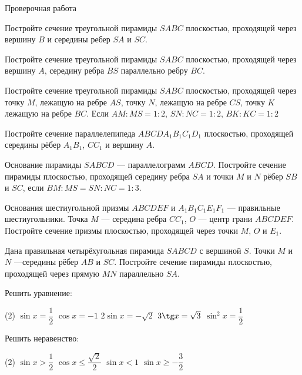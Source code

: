 \begin{exam}
	\begin{listofex}
		\item Проверочная работа
	\end{listofex}
\end{exam}

\begin{consultation}
	\begin{listofex}
		\item Постройте сечение треугольной пирамиды \(SABC\) плоскостью, проходящей через вершину \(B\) и середины ребер \(SA\) и \(SC\).
		\item Постройте сечение треугольной пирамиды \(SABC\) плоскостью, проходящей через вершину \(A\), середину ребра \(BS\) параллельно ребру \(BC\).
		\item  Постройте сечение треугольной пирамиды \(SABC\) плоскостью, проходящей через точку \(M\), лежащую на ребре \(AS\), точку \(N\), лежащую на ребре \(CS\), точку \(K\) лежащую на ребре \(BC\). Если \(AM:MS=1:2\), \(SN:NC=1:2\), \(BK:KC=1:2\)
		\item  Постройте сечение параллелепипеда \(ABCDA_1B_1C_1D_1\) плоскостью, проходящей середины рёбер \(A_1B_1\), \(CC_1\) и вершину \(A\).
		\item Основание пирамиды \(SABCD\) — параллелограмм \(ABCD\). Постройте сечение пирамиды плоскостью, проходящей середину ребра \(SA\) и точки \(M\) и \(N\) рёбер \(SB\) и \(SC\), если \(BM:MS=SN:NC =1:3\).
		\item  Основания шестиугольной призмы \(ABCDEF\) и \(A_1B_1C_1E_1F_1\) --- правильные шестиугольники. Точка \(M\) --- середина ребра \(CC_1\), \(O\) --- центр грани \(ABCDEF\). Постройте сечение призмы плоскостью, проходящей через точки \(M\), \(O\) и \(E_1\).
		\item  Дана правильная четырёхугольная пирамида \(SABCD\) с вершиной \(S\). Точки \(M\) и \(N\) —середины рёбер \(AB\) и \(SC\). Постройте сечение пирамиды плоскостью, проходящей через прямую \(MN\) параллельно \(SA\).
		\newpage
		
		\item Решить уравнение:
		\begin{tasks}(2)
			\task \( \sin x = \dfrac{1}{2} \)
			\task \( \cos x = -1 \)
			\task \( 2\sin x = -\sqrt{2} \)
			\task \( 3\tg x = \sqrt{3} \)
			\task \( \sin^2 x = \dfrac{1}{2} \)
		\end{tasks}
		\item Решить неравенство:
		\begin{tasks}(2)
			\task \( \sin x > \dfrac{1}{2} \)
			\task \( \cos x \le \dfrac{\sqrt{2}}{2} \)
			\task \( \sin x < 1 \)
			\task \( \sin x \ge -\dfrac{3}{2}\)
		\end{tasks}
	\end{listofex}
\end{consultation}
